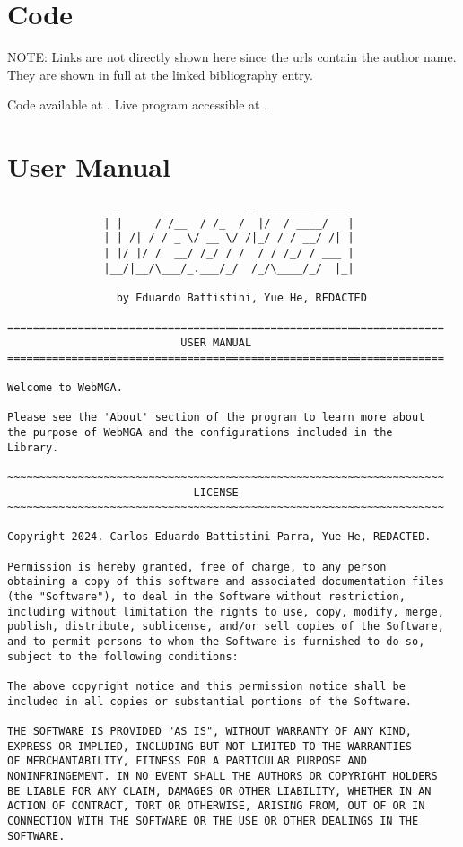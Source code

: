 \section{Code}
NOTE: Links are not directly shown here since the urls contain the author name. They are shown in full at the linked bibliography entry.

Code available at \cite{webmga_3_github}. Live program accessible at \cite{webmga_3_app}.

\section{User Manual}
\begin{lstlisting}
                _       __     __    __  ____________
               | |     / /__  / /_  /  |/  / ____/   |
               | | /| / / _ \/ __ \/ /|_/ / / __/ /| |
               | |/ |/ /  __/ /_/ / /  / / /_/ / ___ |
               |__/|__/\___/_.___/_/  /_/\____/_/  |_|

                 by Eduardo Battistini, Yue He, REDACTED

====================================================================
                           USER MANUAL
====================================================================

Welcome to WebMGA.

Please see the 'About' section of the program to learn more about
the purpose of WebMGA and the configurations included in the
Library.

~~~~~~~~~~~~~~~~~~~~~~~~~~~~~~~~~~~~~~~~~~~~~~~~~~~~~~~~~~~~~~~~~~~~
                             LICENSE
~~~~~~~~~~~~~~~~~~~~~~~~~~~~~~~~~~~~~~~~~~~~~~~~~~~~~~~~~~~~~~~~~~~~

Copyright 2024. Carlos Eduardo Battistini Parra, Yue He, REDACTED.

Permission is hereby granted, free of charge, to any person
obtaining a copy of this software and associated documentation files
(the "Software"), to deal in the Software without restriction,
including without limitation the rights to use, copy, modify, merge,
publish, distribute, sublicense, and/or sell copies of the Software,
and to permit persons to whom the Software is furnished to do so,
subject to the following conditions:

The above copyright notice and this permission notice shall be
included in all copies or substantial portions of the Software.

THE SOFTWARE IS PROVIDED "AS IS", WITHOUT WARRANTY OF ANY KIND,
EXPRESS OR IMPLIED, INCLUDING BUT NOT LIMITED TO THE WARRANTIES
OF MERCHANTABILITY, FITNESS FOR A PARTICULAR PURPOSE AND
NONINFRINGEMENT. IN NO EVENT SHALL THE AUTHORS OR COPYRIGHT HOLDERS
BE LIABLE FOR ANY CLAIM, DAMAGES OR OTHER LIABILITY, WHETHER IN AN
ACTION OF CONTRACT, TORT OR OTHERWISE, ARISING FROM, OUT OF OR IN
CONNECTION WITH THE SOFTWARE OR THE USE OR OTHER DEALINGS IN THE
SOFTWARE.


\end{lstlisting}
